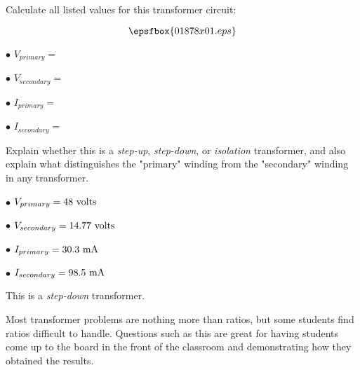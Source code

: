 

Calculate all listed values for this transformer circuit:

$$\epsfbox{01878x01.eps}$$

\medskip
\item{$\bullet$} $V_{primary} = $
\item{$\bullet$} $V_{secondary} = $
\item{$\bullet$} $I_{primary} = $
\item{$\bullet$} $I_{secondary} = $
\medskip

Explain whether this is a {\it step-up}, {\it step-down}, or {\it isolation} transformer, and also explain what distinguishes the "primary" winding from the "secondary" winding in any transformer.







\medskip
\item{$\bullet$} $V_{primary} = 48 \hbox{ volts}$
\item{$\bullet$} $V_{secondary} = 14.77 \hbox{ volts}$
\item{$\bullet$} $I_{primary} = 30.3 \hbox{ mA}$
\item{$\bullet$} $I_{secondary} = 98.5 \hbox{ mA}$
\medskip

This is a {\it step-down} transformer.







Most transformer problems are nothing more than ratios, but some students find ratios difficult to handle.  Questions such as this are great for having students come up to the board in the front of the classroom and demonstrating how they obtained the results.




